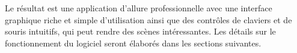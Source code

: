 Le résultat est une application d'allure professionnelle avec une interface graphique riche et simple d’utilisation ainsi que des contrôles de claviers et de souris intuitifs, qui peut rendre des scènes intéressantes.
Les détails sur le fonctionnement du logiciel seront élaborés dans les sections suivantes.
\clearpage
